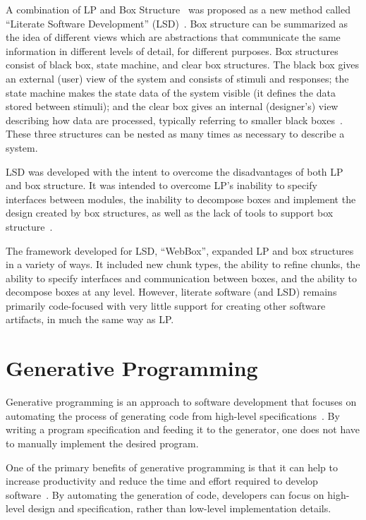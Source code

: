 A combination of LP and Box Structure~\cite{Mills1986} was proposed as a new
method called ``Literate Software Development''
(LSD)~\cite{AlMatiiAndBoujarwah2002}. Box structure can be summarized as the
idea of different views which are abstractions that communicate the same
information in different levels of detail, for different purposes. Box
structures consist of black box, state machine, and clear box structures. The
black box gives an external (user) view of the system and consists of stimuli
and responses; the state machine makes the state data of the system visible (it
defines the data stored between stimuli); and the clear box gives an internal
(designer's) view describing how data are processed, typically referring to
smaller black boxes~\cite{Mills1986}. These three structures can be nested as
many times as necessary to describe a system.

LSD was developed with the intent to overcome the disadvantages of both LP and
box structure. It was intended to overcome LP's inability to specify interfaces
between modules, the inability to decompose boxes and implement the design
created by box structures, as well as the lack of tools to support box
structure~\cite{Deck1996}.

The framework developed for LSD, ``WebBox'', expanded LP and box structures in a
variety of ways. It included new chunk types, the ability to refine chunks, the
ability to specify interfaces and communication between boxes, and the ability
to decompose boxes at any level. However, literate software (and LSD) remains
primarily code-focused with very little support for creating other software
artifacts, in much the same way as LP.

\section{Generative Programming}

Generative programming is an approach to software development that focuses on 
automating the process of generating code from high-level 
specifications~\cite{Czarnecki2000,Taha2006}. By writing a program 
specification and feeding it to the generator, one does not have to manually 
implement the desired program.

One of the primary benefits of generative programming is that it can help to 
increase productivity and reduce the time and effort required to develop 
software~\cite{Krogdahl2004}. By automating the generation of code, developers 
can focus on high-level design and specification, rather than low-level 
implementation details.

